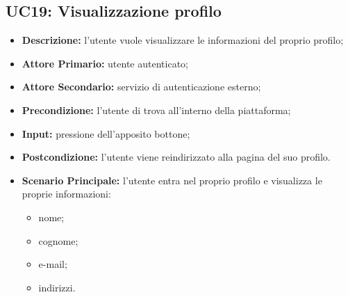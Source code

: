 \subsection{UC19: Visualizzazione profilo}
\label{sec:UC19}
\begin{itemize}
    \item \textbf{Descrizione:} l'utente vuole visualizzare le informazioni del proprio profilo;
    \item \textbf{Attore Primario:} utente autenticato;
    \item \textbf{Attore Secondario:} servizio di autenticazione esterno;
    \item \textbf{Precondizione:} l'utente di trova all'interno della piattaforma;
    \item \textbf{Input:} pressione dell'apposito bottone;
    \item \textbf{Postcondizione:} l'utente viene reindirizzato alla pagina del suo profilo.
    \item \textbf{Scenario Principale:} l'utente entra nel proprio profilo e visualizza le proprie informazioni:
          \begin{itemize}
              \item nome;
              \item cognome;
              \item e-mail;
              \item indirizzi.
          \end{itemize}
\end{itemize}